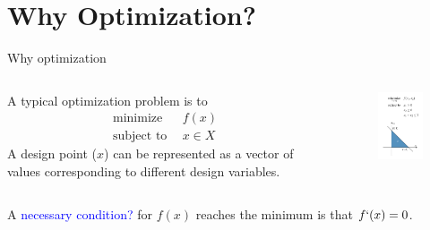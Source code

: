 \documentclass{beamer}
\begin{document}
\section{Why Optimization?}
\begin{frame}{Why optimization}
\begin{columns}
\begin{column}{.55\textwidth}
A typical optimization problem is to 
\begin{equation*}
\begin{split}
    \textrm{minimize} &~~ f(x)\\
    \textrm{subject to} &~~ x \in X    
\end{split}
\end{equation*}
A design point ($x$) can be represented as a vector of values
corresponding to different design variables.
\end{column}

\begin{column}{.45\textwidth}
\begin{figure}
\centering
\includegraphics[width=40mm]{Figs/solution-space.jpeg}
\end{figure}
\end{column}
\end{columns}

A \textcolor{blue}{necessary condition?} for $f(x)$ reaches the minimum is that \textcolor{blue}{$f`(x)=0$}.
\end{frame}
\end{document}
